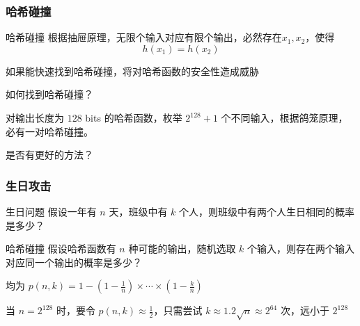 \documentclass{beamer}
\begin{document}
\begin{frame}
    \frametitle{哈希碰撞}
    
    \begin{block}{哈希碰撞}
        根据抽屉原理，无限个输入对应有限个输出，必然存在$x_1,x_2$，使得\[h(x_1)=h(x_2)\]
    \end{block}

    如果能快速找到哈希碰撞，将对哈希函数的安全性造成威胁

    \vline

    如何找到哈希碰撞？

    对输出长度为 $128$ bits 的哈希函数，枚举 $2^{128} + 1$ 个不同输入，根据鸽笼原理，必有一对哈希碰撞。

    是否有更好的方法？

\end{frame}

\begin{frame}
    \frametitle{生日攻击}

    \begin{block}{生日问题}
        假设一年有 $n$ 天，班级中有 $k$ 个人，则班级中有两个人生日相同的概率是多少？
    \end{block}

    \begin{block}{哈希碰撞}
        假设哈希函数有 $n$ 种可能的输出，随机选取 $k$ 个输入，则存在两个输入对应同一个输出的概率是多少？
    \end{block}

    均为 $p(n, k) = 1 - (1 - \frac{1}{n}) \times \cdots \times (1 - \frac{k}{n})$

    \vline

    当 $n = 2^{128}$ 时，要令 $p(n, k)\approx \frac{1}{2}$，只需尝试 $k\approx 1.2 \sqrt{n} \approx 2^{64}$ 次，远小于 $2^{128}$

\end{frame}
\end{document}
